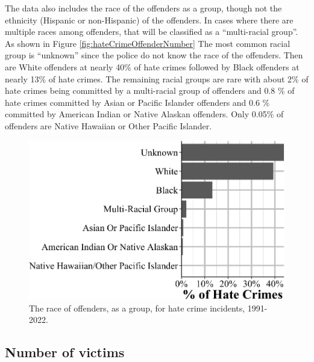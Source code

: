 \documentclass[
  12pt,
  openany]{book}
\begin{document}
The data also includes the race of the offenders as a group, though not the ethnicity (Hispanic or non-Hispanic) of the offenders. In cases where there are multiple races among offenders, that will be classified as a ``multi-racial group''. As shown in Figure \ref{fig:hateCrimeOffenderNumber} The most common racial group is ``unknown'' since the police do not know the race of the offenders. Then are White offenders at nearly 40\% of hate crimes followed by Black offenders at nearly 13\% of hate crimes. The remaining racial groups are rare with about 2\% of hate crimes being committed by a multi-racial group of offenders and 0.8 \% of hate crimes committed by Asian or Pacific Islander offenders and 0.6 \% committed by American Indian or Native Alaskan offenders. Only 0.05\% of offenders are Native Hawaiian or Other Pacific Islander.

\begin{figure}

{\centering \includegraphics[width=0.9\linewidth]{09_hate_crime_files/figure-latex/hateCrimeOffenderRace-1} 

}

\caption{The race of offenders, as a group, for hate crime incidents, 1991-2022.}\label{fig:hateCrimeOffenderRace}
\end{figure}

\subsection{Number of victims}\label{number-of-victims}
\end{document}
